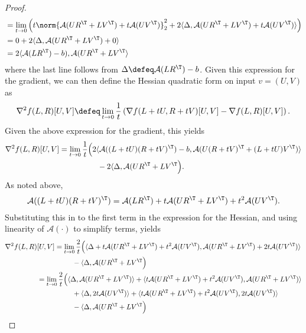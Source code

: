 \begin{proof}
\begin{align*}
        &=\lim_{t\rightarrow 0}\Big(t \norm{\mathcal{A}(UR^\T + LV^\T) + t \mathcal{A}(UV^\T)}^2_2+2 \langle \Delta,\mathcal{A}(UR^\T + LV^\T) + t \mathcal{A}(UV^\T)\rangle\Big)\\
        &=0+2 \langle \Delta,\mathcal{A}(UR^\T + LV^\T) + 0\rangle\\
        &=2\langle \mathcal{A}(LR^\T)-b), \mathcal{A}(UR^\T + LV^\T\rangle
    \end{align*}
    where the last line follows from $\Delta \defeq\mathcal{A}(LR^\T)-b$. Given this expression for the gradient, we can then define the Hessian quadratic form on input $v=(U,V)$ as
    \[
        \nabla^2 f(L,R)[U,V]\defeq \lim_{t\rightarrow 0}\frac{1}{t} \left(\nabla f(L+tU, R+tV)[U,V]-\nabla f(L, R)[U,V]\right).
    \]
    Given the above expression for the gradient, this yields
    \begin{align*}
        \nabla^2 f(L,R)[U,V] &= \lim_{t\rightarrow 0}\frac{1}{t}\Big(2\langle \mathcal{A}((L+tU)(R+tV)^\T) - b, \mathcal{A}(U (R+tV)^\T + (L+tU)V^\T) \rangle\\
        &\qquad \qquad \quad - 2\langle \Delta, \mathcal{A}(UR^\T + LV^\T\Big).
    \end{align*}
    As noted above, 
    \begin{align*}
        \mathcal{A}((L+tU)(R+tV)^\T) = \mathcal{A}(LR^\T) + t \mathcal{A}(UR^\T + LV^\T) + t^2 \mathcal{A}(UV^\T).
    \end{align*}
    Substituting this in to the first term in the expression for the Hessian, and using linearity of $\mathcal{A}(\cdot)$ to simplify terms, yields
    \begin{align*}
        \nabla^2 f(L,R)&[U,V] = \lim_{t\rightarrow 0}\frac{2}{t}\Big(\langle \Delta  +t \mathcal{A}(UR^\T + LV^\T) + t^2 \mathcal{A}(UV^\T), \mathcal{A}(UR^\T + LV^\T) + 2t\mathcal{A}(UV^\T) \rangle\\
        &\qquad \qquad \quad - \langle \Delta, \mathcal{A}(UR^\T + LV^\T\Big)\\
        &= \lim_{t\rightarrow 0}\frac{2}{t}\Big(\langle \Delta,\mathcal{A}(UR^\T + LV^\T)\rangle   + \langle t \mathcal{A}(UR^\T + LV^\T) + t^2 \mathcal{A}(UV^\T), \mathcal{A}(UR^\T + LV^\T)\rangle \\
        &\qquad \qquad \quad +\langle \Delta, 2t\mathcal{A}(UV^\T)\rangle + \langle t \mathcal{A}(UR^\T + LV^\T) + t^2 \mathcal{A}(UV^\T),2t\mathcal{A}(UV^\T)\rangle \\
        &\qquad \qquad \quad - \langle \Delta, \mathcal{A}(UR^\T + LV^\T\Big)\\

\end{align*}
\end{proof}
